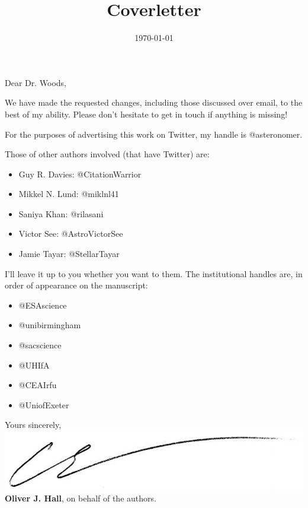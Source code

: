\documentclass[11pt, a4paper, sans, colorlinks, linkcolor=True]{moderncv}
\title{Coverletter}
\begin{document}
\hypersetup{urlcolor=links}
\recipient{\ }{\ }
\date{\today}
\opening{Dear Dr. Woods,}
\makelettertitle
\justify
\vspace{-0.5cm}

We have made the requested changes, including those discussed over email, to the best of my ability. Please don't hesitate to get in touch if anything is missing!

For the purposes of advertising this work on Twitter, my handle is @asteronomer. 

Those of other authors involved (that have Twitter) are:
\begin{itemize}
	\item Guy R. Davies: @CitationWarrior\\
	\item Mikkel N. Lund: @miklnl41\\
	\item Saniya Khan: @rilasani\\
	\item Victor See: @AstroVictorSee\\
	\item Jamie Tayar: @StellarTayar\\
\end{itemize}

I'll leave it up to you whether you want to them. The institutional handles are, in order of appearance on the manuscript:

\begin{itemize}
	\item @ESAscience\\
	\item @unibirmingham\\
	\item @sacscience\\
	\item @UHIfA\\
	\item @CEAIrfu\\
	\item @UniofExeter\\
\end{itemize}

Yours sincerely, \\
\vspace{0.5em}
\includegraphics[scale=0.2]{signature.png} \\ 
\vspace{0.5em}
\textbf{Oliver J. Hall}, on behalf of the authors. \\
\end{document}
